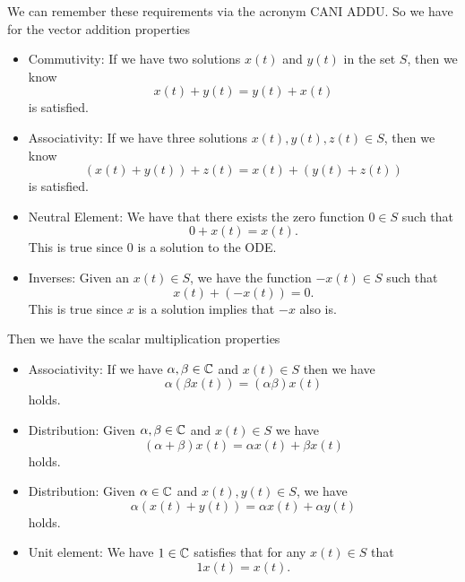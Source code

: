 \documentclass[12pt]{article} %
\begin{document}
\begin{solution}
    We can remember these requirements via the acronym CANI ADDU.  So we have for the vector addition properties
    \begin{itemize}
        \item Commutivity: If we have two solutions $x(t)$ and $y(t)$ in the set $S$, then we know
        \[
        x(t)+y(t)=y(t)+x(t)
        \]
        is satisfied.
        \item Associativity: If we have three solutions $x(t),y(t),z(t)\in S$, then we know
        \[
        (x(t)+y(t))+z(t)=x(t) + (y(t)+z(t))
        \]
        is satisfied.
        \item Neutral Element: We have that there exists the zero function $0\in S$ such that
        \[
        0+x(t)=x(t).
        \]
        This is true since $0$ is a solution to the ODE.
        \item Inverses: Given an $x(t)\in S$, we have the function $-x(t)\in S$ such that
        \[
        x(t)+(-x(t))=0.
        \]
        This is true since $x$ is a solution implies that $-x$ also is.
    \end{itemize}
    Then we have the scalar multiplication properties
    \begin{itemize}
        \item Associativity: If we have $\alpha,\beta \in \mathbb{C}$ and $x(t)\in S$ then we have
        \[
        \alpha (\beta x(t)) = (\alpha \beta)x(t)
        \]
        holds.
        \item Distribution: Given $\alpha,\beta \in \mathbb{C}$ and $x(t)\in S$ we have
        \[
        (\alpha +\beta)x(t) = \alpha x(t) + \beta x(t)
        \]
        holds.
        \item Distribution: Given $\alpha\in \mathbb{C}$ and $x(t),y(t)\in S$, we have
        \[
        \alpha(x(t)+y(t))=\alpha x(t) + \alpha y(t)
        \]
        holds.
        \item Unit element: We have $1\in \mathbb{C}$ satisfies that for any $x(t)\in S$ that
        \[
        1 x(t) = x(t).
        \]
    \end{itemize}


\end{solution}
\end{document}
